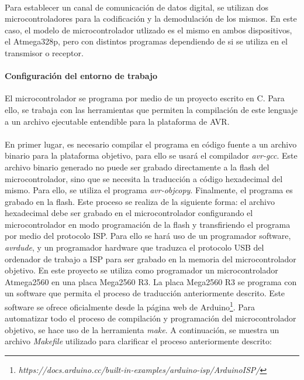 \paragraph{}
Para establecer un canal de comunicación de datos digital, se utilizan dos microcontroladores para la codificación y la demodulación de los mismos. En este caso, el modelo de microcontrolador utlizado es el mismo en ambos dispositivos, el Atmega328p, pero con distintos programas dependiendo de si se utiliza en el transmisor o receptor.

\paragraph{Configuraci\'on del entorno de trabajo}
El microcontrolador se programa por medio de un proyecto escrito en C. Para ello, se trabaja con las herramientas que permiten la compilación de este lenguaje a un archivo ejecutable entendible para la plataforma de AVR.
\paragraph{}
En primer lugar, es necesario compilar el programa en c\'odigo fuente a un archivo binario para la plataforma objetivo, para ello se usar\'a el compilador \textit{avr-gcc}. Este archivo binario generado no puede ser grabado directamente a la flash del microcontrolador, sino que se necesita la traducción a código hexadecimal del mismo. Para ello, se utiliza el programa \textit{avr-objcopy}. 
Finalmente, el programa es grabado en la flash. Este proceso se realiza de la siguiente forma: el archivo hexadecimal debe ser grabado en el microcontrolador configurando el microcontrolador en modo programaci\'on de la flash y transfiriendo el programa por medio del protocolo ISP. Para ello se har\'a uso de un programador software, \textit{avrdude}, y un programador hardware que traduzca el protocolo USB del ordenador de trabajo a ISP para ser grabado en la memoria del microcontrolador objetivo. En este proyecto se utiliza como programador un microcontrolador Atmega2560 en una placa Mega2560 R3. 
La placa Mega2560 R3 se programa con un software que permita el proceso de traducción anteriormente descrito. Este software se ofrece oficialmente desde la p\'agina web de Arduino\footnote{\textit{https://docs.arduino.cc/built-in-examples/arduino-isp/ArduinoISP/}}.
Para automatizar todo el proceso de compilaci\'on y programaci\'on del microcontrolador objetivo, se hace uso de la herramienta \textit{make}. A continuaci\'on, se muestra un archivo \textit{Makefile} utilizado para clarificar el proceso anteriormente descrito:

